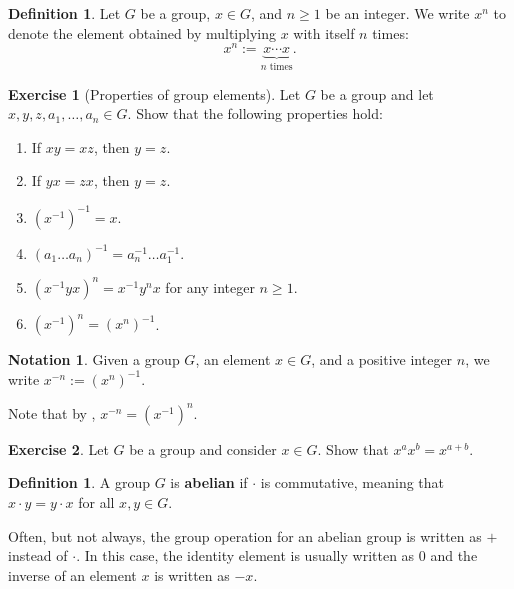 \documentclass[12pt]{report}
\numberwithin{equation}{section}
\numberwithin{theorem}{chapter}
\theoremstyle{definition}
\newtheorem{definition}[theorem]{Definition}
\newtheorem{exercise}{Exercise}
\newtheorem*{basic properties}{Basic Properties}
\newtheorem*{Important Remark}{Important Remark}
\newtheorem{notation}[theorem]{Notation}
\begin{document}
\begin{definition}
	Let $G$ be a group, $x \in G$, and $n \geqslant 1$ be an integer. We write $x^n$ to denote the element obtained by multiplying $x$ with itself $n$ times:
	$$x^n := \underset{n \textrm{ times}}{\underbrace{x \cdots x}}.$$
\end{definition}

\newpage

\begin{exercise}[Properties of group elements]\label{exercise properties of group elements}
Let $G$ be a group and let $x,y,z, a_1,\ldots,a_n \in G$. Show that the following properties hold: 
\begin{enumerate}
\item If $xy = xz$, then $y=z$. 
\item If $yx = zx$, then $y = z$. 
\item $(x^{-1})^{-1} = x$. 
\item $(a_1 \dots a_n)^{-1} = a_n^{-1} \dots a_1^{-1}$. 
\item $(x^{-1}yx)^n = x^{-1}y^nx$ for any integer $n \geqslant 1$.
\item $(x^{-1})^n = (x^n)^{-1}$.
\end{enumerate}
\end{exercise}

\begin{notation}
	Given a group $G$, an element $x \in G$, and a positive integer $n$, we write $x^{-n} := (x^n)^{-1}$.
\end{notation}

Note that by , $x^{-n} = (x^{-1})^n$.

\begin{exercise}
	Let $G$ be a group and consider $x \in G$. Show that $x^ax^b = x^{a+b}$.
\end{exercise}

\begin{definition}
	A group $G$ is {\bf abelian} if $\cdot$ is commutative, meaning that $x \cdot y = y \cdot x$ for all $x,y \in G$.
\end{definition}

Often, but not always, the group operation for an abelian group is written as $+$ instead of $\cdot$. In this case, the identity element is usually written as $0$ and the inverse of an element $x$ is written as $-x$. 
\end{document}
